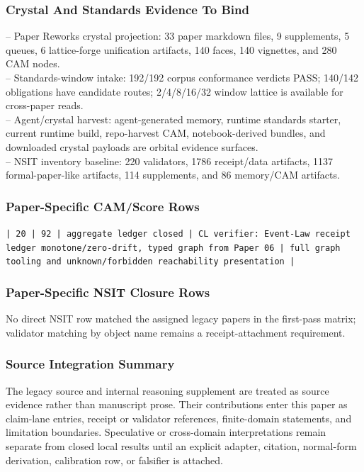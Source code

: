 \documentclass[11pt]{article}
\begin{document}
\subsubsection*{Crystal And Standards Evidence To Bind}

\noindent{}-- Paper Reworks crystal projection: 33 paper markdown files, 9 supplements, 5 queues, 6 lattice-forge unification artifacts, 140 faces, 140 vignettes, and 280 CAM nodes.\\
\noindent{}-- Standards-window intake: 192/192 corpus conformance verdicts PASS; 140/142 obligations have candidate routes; 2/4/8/16/32 window lattice is available for cross-paper reads.\\
\noindent{}-- Agent/crystal harvest: agent-generated memory, runtime standards starter, current runtime build, repo-harvest CAM, notebook-derived bundles, and downloaded crystal payloads are orbital evidence surfaces.\\
\noindent{}-- NSIT inventory baseline: 220 validators, 1786 receipt/data artifacts, 1137 formal-paper-like artifacts, 114 supplements, and 86 memory/CAM artifacts.\\

\subsubsection*{Paper-Specific CAM/Score Rows}

\noindent\texttt{| 20 | 92 | aggregate ledger closed | CL verifier: Event-Law receipt ledger monotone/zero-drift, typed graph from Paper 06 | full graph tooling and unknown/forbidden reachability presentation |}\\

\subsubsection*{Paper-Specific NSIT Closure Rows}

No direct NSIT row matched the assigned legacy papers in the first-pass matrix; validator matching by object name remains a receipt-attachment requirement.

\subsubsection*{Source Integration Summary}

The legacy source and internal reasoning supplement are treated as source
evidence rather than manuscript prose. Their contributions enter this paper as
claim-lane entries, receipt or validator references, finite-domain statements,
and limitation boundaries. Speculative or cross-domain interpretations remain
separate from closed local results until an explicit adapter, citation,
normal-form derivation, calibration row, or falsifier is attached.
\end{document}
